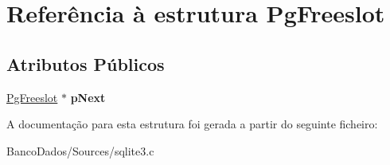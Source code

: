 \hypertarget{struct_pg_freeslot}{\section{Referência à estrutura Pg\-Freeslot}
\label{struct_pg_freeslot}
}
\subsection*{Atributos Públicos}
\begin{DoxyCompactItemize}
\item 
\hypertarget{struct_pg_freeslot_ac38a6e51f86c650fb943585d7b6c8b70}{\hyperlink{struct_pg_freeslot}{Pg\-Freeslot} $\ast$ {\bfseries p\-Next}}\label{struct_pg_freeslot_ac38a6e51f86c650fb943585d7b6c8b70}

\end{DoxyCompactItemize}


A documentação para esta estrutura foi gerada a partir do seguinte ficheiro\-:\begin{DoxyCompactItemize}
\item 
Banco\-Dados/\-Sources/sqlite3.\-c\end{DoxyCompactItemize}
